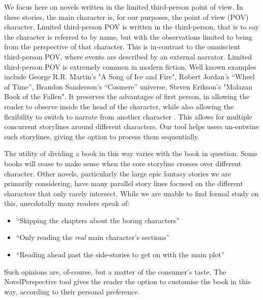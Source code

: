 \documentclass[11pt,a4paper]{article}
\newcommand{\parencite}{\citep}
\begin{document}
We focus here on novels written in the limited third-person point of view.
In these stories, the main character is, for our purposes, the point of view (POV) character.
Limited third-person POV is written in the third-person, that is to say the character is referred to by name, but with the observations limited to being from the perspective of that character.
This is in-contrast to the omniscient third-person POV, where events are described by an external narrator.
Limited third-person POV is extremely common in modern fiction.
Well known examples include George R.R. Martin's "A Song of Ice and Fire", 
Robert Jordan's ``Wheel of Time'', Brandon Sanderson's ``Cosmere'' universe, 
Steven Erikson's "Malazan Book of the Fallen".
It preserves the advantages of first person, in allowing the reader to observe inside the head of the character, while also allowing the flexibility to switch to narrate from another character \parencite{booth2010rhetoric}.
This allows for multiple concurrent storylines around different characters.
Our tool helps users un-entwine such storylines, giving the option to process them sequentially.







The utility of dividing a book in this way varies with the book in question.
Some books will cease to make sense when the core storyline crosses over different character.
Other novels, particularly the large epic fantasy stories we are primarily considering,
have many parallel story lines focused on the different characters that only rarely intersect.
While we are unable to find formal study on this, 
anecdotally many readers speak of:
\begin{itemize}
	\item ``Skipping the chapters about the boring characters''
	\item ``Only reading the \emph{real} main character's sections''
	\item ``Reading ahead past the side-stories to get on with the main plot''	
\end{itemize}
Such opinions are, of-course, but a matter of the consumer's taste.
The NovelPerspective tool gives the reader the option to customise the book in this way, according to their personal preference.
\end{document}
